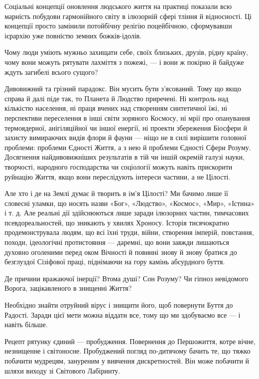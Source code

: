 Соціальні концепції оновлення людського життя на практиці показали всю марність
побудови гармонійного світу в ілюзорній сфері тління й відносності. Ці
концепції просто замінили потойбічну релігію поцейбічною, сформувавши ієрархію
уже повністю земних божків-ідолів.

Чому люди уміють мужньо захищати себе, своїх близьких, друзів, рідну країну,
чому вони можуть рятувати лахміття з пожежі, — і вони ж покірно й байдуже ждуть
загибелі всього сущого?

Дивовижний та грізний парадокс. Він мусить бути з’ясований. Тому що якщо справа
й далі піде так, то Планета й Людство приречені. Ні контроль над кількістю
населення, ні праця вчених над створенням синтетичної їжі, ні перспективи
переселення в інші світи зоряного Космосу, ні мрії про опанування термоядерної,
анігіляційної чи іншої енергії, ні проекти збереження Біосфери й захисту
вимираючих видів флори й фауни — ніщо не в силі вирішити головної проблеми:
проблеми Єдності Життя, а з нею й проблеми Єдності Сфери Розуму. Досягнення
найдивовижніших результатів в тій чи іншій окремій галузі науки, творчості,
народного господарства чи соціології можуть навіть прискорити руйнацію Життя,
якщо вони переслідують інтереси частини, а не Цілості.

Але хто і де на Землі думає й творить в ім’я Цілості? Ми бачимо лише її
словесні уламки, що носять назви «Бог», «Людство», «Космос», «Мир», «Істина» і
т. д. Але реальні дії здійснюються лише заради ілюзорних частин, тимчасових
псевдореальностей, що зникають у хвилях Хроносу. Історія тисячократно
продемонструвала людям, що всі їхні труди, війни, створення імперій, повстання,
походи, ідеологічні протистояння — даремні, що вони завжди лишаються духовно
оголеними перед оком Вічності й повинні знову й знову братися до безглуздої
Сізіфової праці, піднімаючи на гору камінь абсурдного буття.

Де причини вражаючої інерції? Втома душі? Сон Розуму? Чи гіпноз невідомого
Ворога, зацікавленого в знищенні Життя?

Необхідно знайти отруйний вірус і знищити його, щоб повернути Буття до Радості.
Заради цієї мети можна віддати все, тому що ми здобуваємо все — і навіть
більше.

Рецепт рятунку єдиний — пробудження. Повернення до Першожиття, котре вічне,
незнищенне і світоносне. Пробуджений погляд по-дитячому бачить те, що тяжко
побачити мудрецям, зануреним у вивчення дискретностей. Він може побачити й
шляхи виходу зі Світового Лабіринту.

